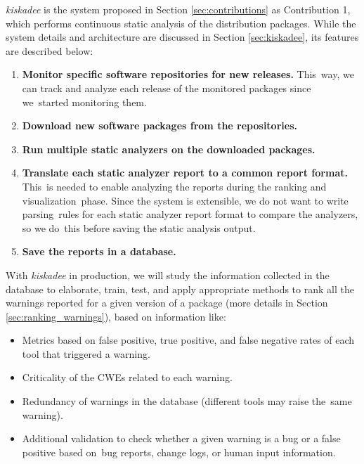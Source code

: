 \textit{kiskadee} is the system proposed in Section
\ref{sec:contributions} as Contribution 1, which performs continuous static analysis of the
distribution packages. While the system details and architecture are discussed
in Section \ref{sec:kiskadee}, its features are described below:

\begin{enumerate}
\item \textbf{Monitor specific software repositories for new releases.} This\
way, we can track and analyze each release of the monitored packages since we\
started monitoring them.

\item \textbf{Download new software packages from the repositories.}

\item \textbf{Run multiple static analyzers on the downloaded packages.}

\item \textbf{Translate each static analyzer report to a common report format.} This\
is needed to enable analyzing the reports during the ranking and visualization\
phase. Since the system is extensible, we do not want to write parsing\
rules for each static analyzer report format to compare the analyzers, so we do\
this before saving the static analysis output.

\item \textbf{Save the reports in a database.}
\end{enumerate}

With \textit{kiskadee} in production, we will study the information collected
in the database to elaborate, train, test, and apply appropriate methods to
rank all the warnings reported for a given version of a package (more details
in Section \ref{sec:ranking_warnings}), based on information like:

\begin{itemize}
  \item Metrics based on false positive, true positive, and false negative rates of each tool that triggered a warning.

  \item Criticality of the CWEs related to each warning.

  \item Redundancy of warnings in the database (different tools may raise the\
    same warning).

  \item Additional validation to check whether a given warning is a bug or a false positive based on\
    bug reports, change logs, or human input information.
\end{itemize}

